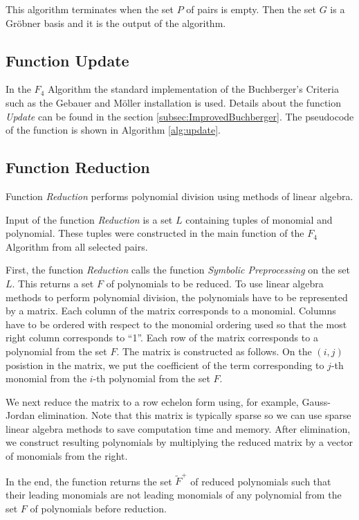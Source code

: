This algorithm terminates when the set $P$ of pairs is empty. Then the set $G$ is a Gr\"obner basis and it is the output of the algorithm.



\subsection{Function Update}
In the $F_4$ Algorithm the standard implementation of the Buchberger's Criteria such as the Gebauer and M\"oller installation \cite{Gebauer-Moller88} is used. Details about the function \textit{Update} can be found in the section \ref{subsec:ImprovedBuchberger}. The pseudocode of the function is shown in Algorithm \ref{alg:update}.

\subsection{Function Reduction}
Function \textit{Reduction} performs polynomial division using methods of linear algebra.

Input of the function \textit{Reduction} is a set $L$ containing tuples of monomial and polynomial. These tuples were constructed in the main function of the $F_4$ Algorithm from all selected pairs.

First, the function \textit{Reduction} calls the function \textit{Symbolic Preprocessing} on the set $L$. This returns a set $F$ of polynomials to be reduced. To use linear algebra methods to perform polynomial division, the polynomials have to be represented by a matrix. Each column of the matrix corresponds to a monomial. Columns have to be ordered with respect to the monomial ordering used so that the most right column corresponds to ``1''. Each row of the matrix corresponds to a polynomial from the set $F$. The matrix is constructed as follows. On the $(i, j)$ posistion in the matrix, we put the coefficient of the term corresponding to $j$-th monomial from the $i$-th polynomial from the set $F$.

We next reduce the matrix to a row echelon form using, for example, Gauss-Jordan elimination. Note that this matrix is typically sparse so we can use sparse linear algebra methods to save computation time and memory. After elimination, we construct resulting polynomials by multiplying the reduced matrix by a vector of monomials from the right.

In the end, the function returns the set $\tilde{F}^+$ of reduced polynomials such that their leading monomials are not leading monomials of any polynomial from the set $F$ of polynomials before reduction.

